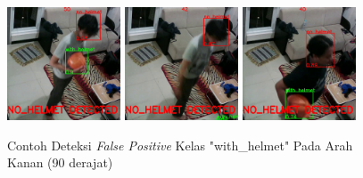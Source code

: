\begin{figure} [h]
    \centering
    \includegraphics[width=0.3\textwidth]{gambar/analisis_gambar/kanan_salah_FPhelm/test1_cctv_pred (12).png}
    \includegraphics[width=0.3\textwidth]{gambar/analisis_gambar/kanan_salah_FPhelm/test1_cctv_pred.png}
    \includegraphics[width=0.3\textwidth]{gambar/analisis_gambar/kanan_salah_FPhelm/test2_cctv_pred (10).png}
    \caption{Contoh Deteksi \emph{False Positive} Kelas "with\_helmet" Pada Arah Kanan (90 derajat)}
    \label{fig:example_fp_direct_right}
\end{figure}

